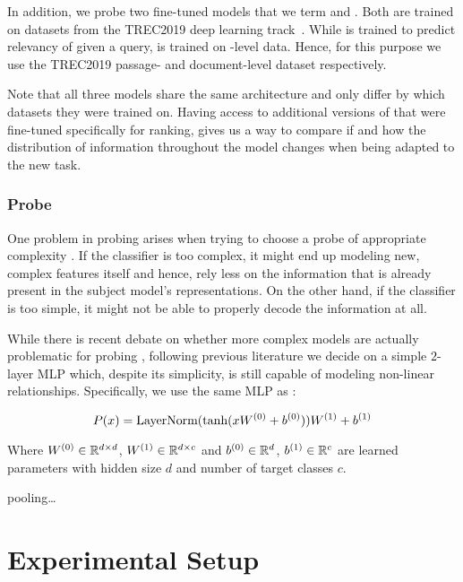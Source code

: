 In addition, we probe two fine-tuned  models that we term  and . Both are trained on datasets from the TREC2019 deep learning track~\cite{DBLP:journals/corr/abs-2003-07820}. While  is trained to predict relevancy of  given a query,  is trained on -level data. Hence, for this purpose we use the TREC2019 passage- and document-level dataset respectively.

Note that all three models share the same architecture and only differ by which datasets they were trained on. Having access to additional versions of  that were fine-tuned specifically for ranking, gives us a way to compare if and how the distribution of information throughout the model changes when being adapted to the new task.

\subsubsection{Probe}
One problem in probing arises when trying to choose a probe of appropriate complexity \cite{hewitt-liang-2019-designing}. If the classifier is too complex, it might end up modeling new, complex features itself and hence, rely less on the information that is already present in the subject model's representations. On the other hand, if the classifier is too simple, it might not be able to properly decode the information at all.

While there is recent debate on whether more complex models are actually problematic for probing \cite{pimentel-etal-2020-information}, following previous literature \cite{Tenney2019WhatDY,tenney-etal-2019-bert, hewitt-liang-2019-designing} we decide on a simple $2$-layer MLP which, despite its simplicity, is still capable of modeling non-linear relationships.
Specifically, we use the same MLP as \cite{Tenney2019WhatDY}:

\begin{equation}
    P(x) = \text{LayerNorm}(\text{tanh}(x W^{(0)} + b^{(0)})) W^{(1)} + b^{(1)}
\end{equation}

Where $W^{(0)} \in \mathbb{R}^{d \times d}$,  $W^{(1)} \in \mathbb{R}^{d \times c}$ and $b^{(0)} \in \mathbb{R}^{d}$,  $b^{(1)} \in \mathbb{R}^{c}$ are learned parameters with hidden size $d$ and number of target classes $c$.

pooling\dots

\section{Experimental Setup}

